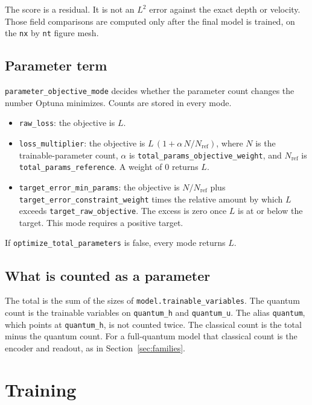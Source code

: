 \documentclass[11pt]{article}
\begin{document}
The score is a residual.
It is not an \(L^{2}\) error against the exact depth or velocity.
Those field comparisons are computed only after the final model is trained, on the \texttt{nx} by \texttt{nt} figure mesh.

\subsection{Parameter term}

\texttt{parameter\_objective\_mode} decides whether the parameter count changes the number Optuna minimizes.
Counts are stored in every mode.

\begin{itemize}[leftmargin=1.4em]
\item \texttt{raw\_loss}: the objective is \(L\).
\item \texttt{loss\_multiplier}: the objective is \(L\,(1+\alpha\,N/N_{\mathrm{ref}})\), where \(N\) is the trainable-parameter count, \(\alpha\) is \texttt{total\_params\_objective\_weight}, and \(N_{\mathrm{ref}}\) is \texttt{total\_params\_reference}.
  A weight of 0 returns \(L\).
\item \texttt{target\_error\_min\_params}: the objective is \(N/N_{\mathrm{ref}}\) plus \texttt{target\_error\_constraint\_weight} times the relative amount by which \(L\) exceeds \texttt{target\_raw\_objective}.
  The excess is zero once \(L\) is at or below the target.
  This mode requires a positive target.
\end{itemize}

If \texttt{optimize\_total\_parameters} is false, every mode returns \(L\).

\subsection{What is counted as a parameter}

The total is the sum of the sizes of \texttt{model.trainable\_variables}.
The quantum count is the trainable variables on \texttt{quantum\_h} and \texttt{quantum\_u}.
The alias \texttt{quantum}, which points at \texttt{quantum\_h}, is not counted twice.
The classical count is the total minus the quantum count.
For a full-quantum model that classical count is the encoder and readout, as in Section~\ref{sec:families}.

\section{Training}
\end{document}
